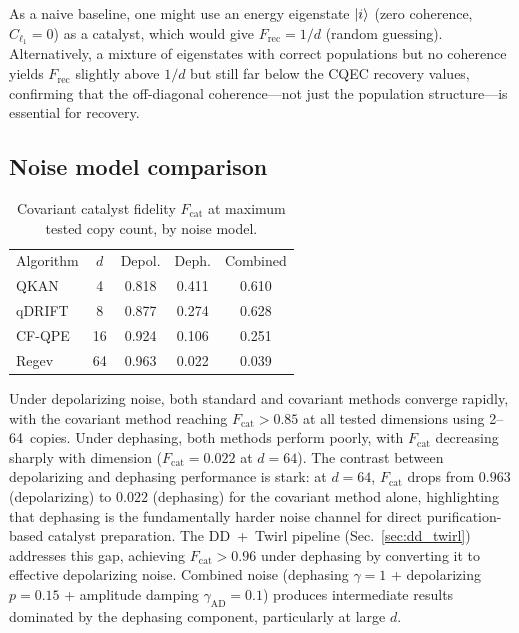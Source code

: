 \documentclass[prx,twocolumn,superscriptaddress,longbibliography,floatfix]{revtex4-2}
\begin{document}
As a naive baseline, one might use an energy eigenstate $\ket{i}$ (zero coherence, $C_{\ell_1} = 0$) as a catalyst, which would give $F_\mathrm{rec} = 1/d$ (random guessing).
Alternatively, a mixture of eigenstates with correct populations but no coherence yields $F_\mathrm{rec}$ slightly above $1/d$ but still far below the CQEC recovery values, confirming that the off-diagonal coherence---not just the population structure---is essential for recovery.

\subsection{Noise model comparison}
\label{sec:noise_comparison}

\begin{table}[tb]
\caption{Covariant catalyst fidelity $F_\mathrm{cat}$ at maximum tested copy count, by noise model.}
\label{tab:noise}
\begin{ruledtabular}
\begin{tabular}{lcccc}
Algorithm & $d$ & Depol. & Deph. & Combined \\
\colrule
QKAN & 4 & 0.818 & 0.411 & 0.610 \\
qDRIFT & 8 & 0.877 & 0.274 & 0.628 \\
CF-QPE & 16 & 0.924 & 0.106 & 0.251 \\
Regev & 64 & 0.963 & 0.022 & 0.039 \\
\end{tabular}
\end{ruledtabular}
\end{table}

Under depolarizing noise, both standard and covariant methods converge rapidly, with the covariant method reaching $F_\mathrm{cat} > 0.85$ at all tested dimensions using 2--64~copies.
Under dephasing, both methods perform poorly, with $F_\mathrm{cat}$ decreasing sharply with dimension ($F_\mathrm{cat} = 0.022$ at $d = 64$).
The contrast between depolarizing and dephasing performance is stark: at $d = 64$, $F_\mathrm{cat}$ drops from $0.963$ (depolarizing) to $0.022$ (dephasing) for the covariant method alone, highlighting that dephasing is the fundamentally harder noise channel for direct purification-based catalyst preparation.
The DD~+~Twirl pipeline (Sec.~\ref{sec:dd_twirl}) addresses this gap, achieving $F_\mathrm{cat} > 0.96$ under dephasing by converting it to effective depolarizing noise.
Combined noise (dephasing $\gamma = 1$ + depolarizing $p = 0.15$ + amplitude damping $\gamma_\mathrm{AD} = 0.1$) produces intermediate results dominated by the dephasing component, particularly at large $d$.
\end{document}
